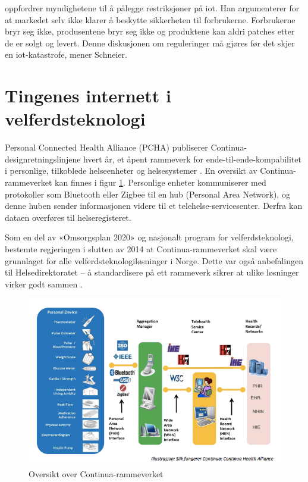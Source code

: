\citet{iot_schneier_regulation} oppfordrer myndighetene til å pålegge restriksjoner på \gls{iot}.
Han argumenterer for at markedet selv ikke klarer å beskytte sikkerheten til forbrukerne.
Forbrukerne bryr seg ikke, produsentene bryr seg ikke og produktene kan aldri patches
etter de er solgt og levert. Denne diskusjonen om reguleringer må gjøres før det skjer
en \gls{iot}-katastrofe, mener Schneier.


\section{Tingenes internett i velferdsteknologi}
Personal Connected Health Alliance (PCHA) publiserer Continua-designretningslinjene hvert år,
et åpent rammeverk for ende-til-ende-kompabilitet i personlige, tilkoblede helseenheter og helsesystemer \citep{continua_guidelines}.
En oversikt av Continua-rammeverket kan finnes i figur \ref{fig:continua}. Personlige enheter kommuniserer med
protokoller som Bluetooth eller Zigbee til en hub (Personal Area Network), og denne huben sender informasjonen
videre til et telehelse-servicesenter. Derfra kan dataen overføres til helseregisteret.

Som en del av «Omsorgsplan 2020» og nasjonalt program for velferdsteknologi, bestemte regjeringen
i slutten av 2014 at Continua-rammeverket skal være grunnlaget for alle velferdsteknologiløsninger i Norge.
Dette var også anbefalingen til Helsedirektoratet --
å standardisere på ett rammeverk sikrer at ulike løsninger virker godt sammen \citep{regjeringen_continua}.

\begin{figure}
\includegraphics[width=1.0\textwidth,center]{fig/continua}
\caption{Oversikt over Continua-rammeverket}
\label{fig:continua}
\end{figure}

